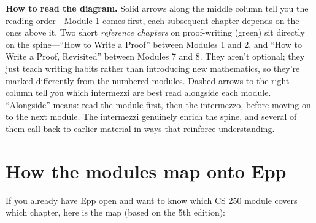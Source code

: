 \documentclass[11pt]{article}
\begin{document}
\begin{center}
\end{center}

\noindent\textbf{How to read the diagram.} Solid arrows along the middle column tell you the reading order---Module 1 comes first, each subsequent chapter depends on the ones above it. Two short \emph{reference chapters} on proof-writing (green) sit directly on the spine---``How to Write a Proof'' between Modules 1 and 2, and ``How to Write a Proof, Revisited'' between Modules 7 and 8. They aren't optional; they just teach writing habits rather than introducing new mathematics, so they're marked differently from the numbered modules. Dashed arrows to the right column tell you which intermezzi are best read alongside each module. ``Alongside'' means: read the module first, then the intermezzo, before moving on to the next module. The intermezzi genuinely enrich the spine, and several of them call back to earlier material in ways that reinforce understanding.

\section*{How the modules map onto Epp}

If you already have Epp open and want to know which CS 250 module covers which chapter, here is the map (based on the 5th edition):
\end{document}
